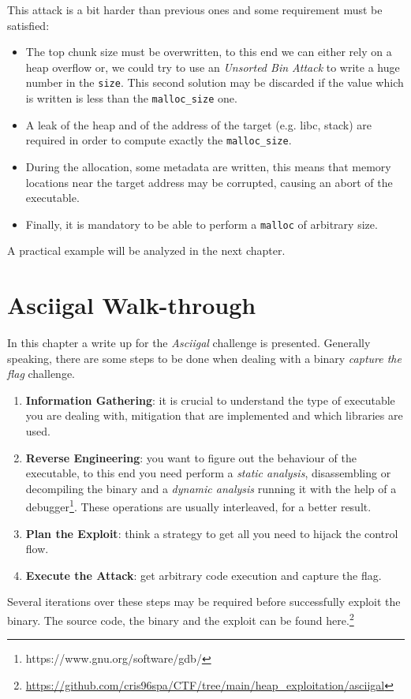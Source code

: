 \documentclass{article}
\numberwithin{equation}{subsection}
\begin{document}
This attack is a bit harder than previous ones and some requirement must be satisfied:
\begin{itemize}
    \item The top chunk size must be overwritten, to this end we can either rely on a heap overflow or, we could try to use an \emph{Unsorted Bin Attack} to write a huge number in the \texttt{size}. This second solution may be discarded if the value which is written is less than the \texttt{malloc\_size} one. 
    \item A leak of the heap and of the address of the target (e.g. libc, stack) are  required in order to compute exactly the \texttt{malloc\_size}.
    \item During the allocation, some metadata are written, this means that memory locations near the target address may be corrupted, causing an abort of the executable.
    \item Finally, it is mandatory to be able to perform a \texttt{malloc} of arbitrary size.
\end{itemize}
A practical example will be analyzed in the next chapter.
\section{Asciigal Walk-through}
In this chapter a write up for the \emph{Asciigal} challenge is presented. Generally speaking, there are some steps to be done when dealing with a binary \emph{capture the flag} challenge.
\begin{enumerate}
    \item \textbf{Information Gathering}: it is crucial to understand the type of executable you are dealing with, mitigation that are implemented and which libraries are used.
    \item \textbf{Reverse Engineering}: you want to figure out the behaviour of the executable, to this end you need perform a \emph{static analysis}, disassembling or decompiling the binary and a \emph{dynamic analysis} running it with the help of a debugger\footnote{https://www.gnu.org/software/gdb/}. These operations are usually interleaved, for a better result.
    \item \textbf{Plan the Exploit}: think a strategy to get all you need to hijack the control flow.
    \item \textbf{Execute the Attack}: get arbitrary code execution and capture the flag.
\end{enumerate}
Several iterations over these steps may be required before successfully exploit the binary. The source code, the binary and the exploit can be found here.\footnote{\href{https://github.com/cris96spa/CTF/tree/main/heap_exploitation/asciigal}{https://github.com/cris96spa/CTF/tree/main/heap\_exploitation/asciigal}}\clearpage
\end{document}
